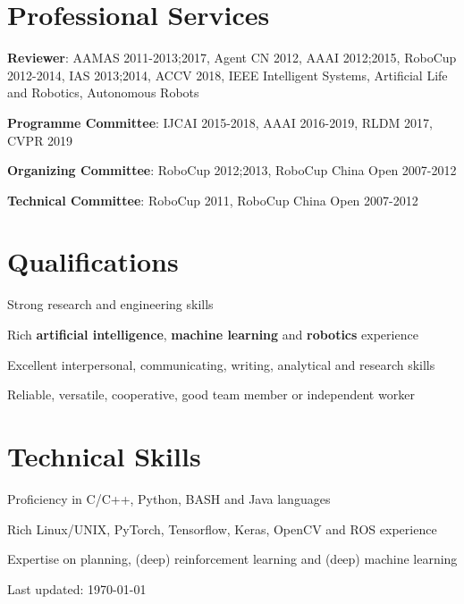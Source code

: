 \documentclass[letterpaper,10pt]{article}
\def\footerlink{}
\renewenvironment{itemize}{
  \begin{list}{}{
    \setlength{\leftmargin}{1.5em}
  }
}{
  \end{list}
}
\begin{document}
\vspace{10pt}
\section*{Professional Services}
\begin{itemize}
	\item \textbf{Reviewer}: AAMAS 2011-2013;2017, Agent CN 2012, AAAI 2012;2015, RoboCup 2012-2014, IAS 2013;2014, ACCV 2018, IEEE Intelligent Systems, Artificial Life and Robotics, Autonomous Robots
	\item \textbf{Programme Committee}: IJCAI 2015-2018, AAAI 2016-2019, RLDM 2017, CVPR 2019
	\item \textbf{Organizing Committee}: RoboCup 2012;2013, RoboCup China Open 2007-2012
	\item \textbf{Technical Committee}: RoboCup 2011, RoboCup China Open 2007-2012
\end{itemize}

\vspace{10pt}
\section*{Qualifications}
\begin{itemize}
	\item Strong research and engineering skills
	\item Rich \textbf{artificial intelligence}, \textbf{machine learning} and \textbf{robotics} experience
	\item Excellent interpersonal, communicating, writing, analytical and research skills
	\item Reliable, versatile, cooperative, good team member or independent worker
\end{itemize}

\vspace{10pt}
\section*{Technical Skills}
\begin{itemize}
	\item Proficiency in C/C++, Python, BASH and Java languages
	\item Rich Linux/UNIX, PyTorch, Tensorflow, Keras, OpenCV and ROS experience
	\item Expertise on planning, (deep) reinforcement learning and (deep) machine learning
\end{itemize}

\bigskip

\begin{center}
  \begin{footnotesize}
    Last updated: \today \\
    \href{\footerlink}{\texttt{\footerlink}}
  \end{footnotesize}
\end{center}
\end{document}
